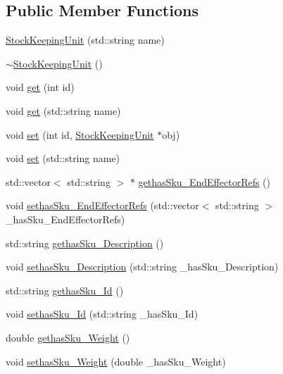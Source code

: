 \subsection*{Public Member Functions}
\begin{DoxyCompactItemize}
\item 
\hyperlink{class_stock_keeping_unit_a907487cb82a68138ff5260c2fd1b63dc}{StockKeepingUnit} (std::string name)
\item 
\hyperlink{class_stock_keeping_unit_a496bd82db3f7e0e477148172ba00580c}{$\sim$StockKeepingUnit} ()
\item 
void \hyperlink{class_stock_keeping_unit_a03f9d33f0a8e6f9315e853967aac158c}{get} (int id)
\item 
void \hyperlink{class_stock_keeping_unit_a28cc44a2000d0c834e03456f96543bff}{get} (std::string name)
\item 
void \hyperlink{class_stock_keeping_unit_a8d38d296b3b8a624a214c957a5930a0e}{set} (int id, \hyperlink{class_stock_keeping_unit}{StockKeepingUnit} $\ast$obj)
\item 
void \hyperlink{class_stock_keeping_unit_ad7241fe76fce2b27704a1c68e9c78edd}{set} (std::string name)
\item 
std::vector$<$ std::string $>$ $\ast$ \hyperlink{class_stock_keeping_unit_a9128675277cbe649e5d9afe21f945a4e}{gethasSku\_\-EndEffectorRefs} ()
\item 
void \hyperlink{class_stock_keeping_unit_afad64493ee0c81ef4995a843227be032}{sethasSku\_\-EndEffectorRefs} (std::vector$<$ std::string $>$ \_\-hasSku\_\-EndEffectorRefs)
\item 
std::string \hyperlink{class_stock_keeping_unit_a14a20f5eb16bc11eb12bc46086c86970}{gethasSku\_\-Description} ()
\item 
void \hyperlink{class_stock_keeping_unit_a3a20d91ca26c4e0103f50702ee6cbb88}{sethasSku\_\-Description} (std::string \_\-hasSku\_\-Description)
\item 
std::string \hyperlink{class_stock_keeping_unit_ad7450fa202a53a551543700fd0a48ce9}{gethasSku\_\-Id} ()
\item 
void \hyperlink{class_stock_keeping_unit_abef3ae341a8b0b585e2b31d8c8874a35}{sethasSku\_\-Id} (std::string \_\-hasSku\_\-Id)
\item 
double \hyperlink{class_stock_keeping_unit_a83d0d18c39b64bb438ae53ee32b2d12a}{gethasSku\_\-Weight} ()
\item 
void \hyperlink{class_stock_keeping_unit_a3f97fbe8db175e041c35f30b918c073c}{sethasSku\_\-Weight} (double \_\-hasSku\_\-Weight)
\item 

\end{DoxyCompactItemize}

